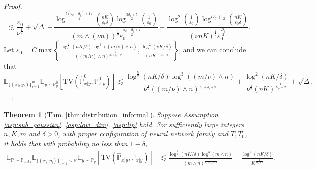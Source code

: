 \documentclass{article}
\numberwithin{equation}{section}
\newcommand{\E}{\mathbb{E}}
\newtheorem{thm}{Theorem}[section]
\theoremstyle{definition}
\newcommand{\Pmeta}{\mathbb{P}_{\text{meta}}}
\renewcommand{\P}{\mathbb{P}}
\begin{document}
\begin{proof}
\begin{equation}
        \lesssim \frac{\varepsilon_0}{\nu^{\frac{1}{2}}} +\sqrt{\Delta}+\frac{\log^{\frac{5(d_x+d_y)+17}{4}}(\frac{nK}{\varepsilon_0\delta})
        \log^{\frac{3d_x+5}{2}}(\frac{1}{\varepsilon_0})}{(m\wedge (\nu n))^{\frac{1}{2}}\varepsilon_0^{\frac{d_x+d_y+7}{2}}}  + \frac{\log^2(\frac{1}{\varepsilon_0})\log^{D_y+\frac{1}{2}}(\frac{nK}{\varepsilon_0\delta})}{(\nu nK)^{\frac{1}{2}}\varepsilon_0^{\frac{D_y}{2}}}.
    \end{equation}
    Let $\varepsilon_0=C\max\left\{\frac{\log^{\frac{5}{2}}(nK/\delta)\log^3((m/\nu)\wedge n)}{((m/\nu)\wedge n)^{\frac{1}{d_x+d_y+9}}},\frac{\log^2(nK/\delta)}{(nK)^{\frac{1}{D_y+2}}}\right\}$, and we can conclude that
    \begin{equation}
        \E_{\{(x_i,y_i)\}_{i=1}^m}\E_{y\sim\P^0_y} [\mathrm{TV}(\widehat{\P}^0_{x|y},\P^0_{x|y})]
        \lesssim \frac{\log^{\frac{5}{2}}(nK/\delta)\log^3((m/\nu)\wedge n)}{\nu^{\frac{1}{2}}((m/\nu)\wedge n)^{\frac{1}{d_x+d_y+9}}}+\frac{\log^2(nK/\delta)}{\nu^{\frac{1}{2}}(nK)^{\frac{1}{D_y+2}}}+\sqrt{\Delta}.
    \end{equation}
\end{proof}

\begin{thm}[Thm. \ref{thm:distribution_informal}]
\label{thm:distribution}
    Suppose Assumption \ref{asp:sub_gaussian}, \ref{asp:low_dim}, \ref{asp:lip} hold.
    For sufficiently large integers $n,K,m$ and $\delta>0$, with proper configuration of neural network family and $T,T_0$, it holds that with probability no less than $1-\delta$,
    \begin{equation}
        \begin{aligned}
            \E_{\P\sim\Pmeta}\E_{\{(x_i,y_i)\}_{i=1}^m\sim \P}\E_{y\sim\P_y} [\mathrm{TV}(\widehat{\P}_{x|y},\P_{x|y})]
            &\lesssim \frac{\log^{\frac{5}{2}}(nK/\delta)\log^3(m\wedge n)}{(m\wedge n)^{\frac{1}{d_x+d_y+9}}}+\frac{\log^2(nK/\delta)}{K^{\frac{1}{D_y+2}}}.
        \end{aligned}
    \end{equation}
\end{thm}
\end{document}
